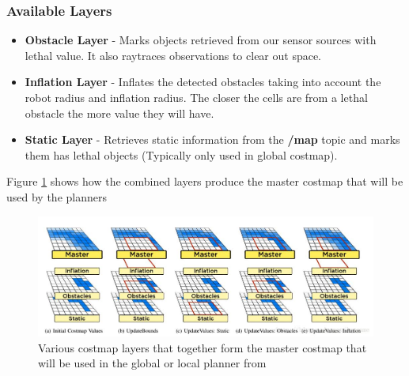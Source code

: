 \subsubsection*{Available Layers}
\begin{itemize}
    \item \textbf{Obstacle Layer} - Marks objects retrieved from our sensor sources with lethal value. It also raytraces observations to clear out space.
    \item \textbf{Inflation Layer} - Inflates the detected obstacles taking into account the robot radius and inflation radius. The closer the cells are from a lethal obstacle the more value they will have.
    \item \textbf{Static Layer} - Retrieves static information from the \textbf{/map} topic and marks them has lethal objects (Typically only used in global costmap).
\end{itemize}

Figure \ref{fig:layers1} shows how the combined layers produce the master costmap that will be used by the planners \cite{lu2014layered}

\begin{figure}[!htb]
    \centering
    \includegraphics[width=\linewidth]{imgs/chapter3/layers1.png}
    \caption{Various costmap layers that together form the master costmap that will be used in the global or local planner from \cite{lu2014layered}}
    \label{fig:layers1}
\end{figure}



